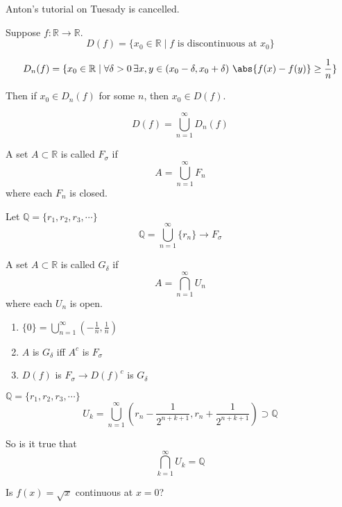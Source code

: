 
Anton's tutorial on Tuesady is cancelled.


Suppose $f\colon \mathbb{R}\to\mathbb{R}$. \[D(f) =\{x_0\in\mathbb{R} \mid f \text{ is discontinuous at }x_0\}\]

\[D_n(f) = \{x_0\in\mathbb{R} \mid \forall \delta>0 \, \exists x,y\in (x_0-\delta ,x_0+\delta) \ \abs{f(x) - f(y)}\geq \frac{1}{n}\}\]

Then if $x_0\in D_n(f)$ for some $n$, then $x_0 \in D(f)$.

\begin{note}
    \[D(f) = \bigcup_{n=1}^\infty D_n(f)\]
\end{note}

\begin{defn}
    A set $A\subset \mathbb{R}$ is called $F_\sigma$ if \[A = \bigcup_{n=1}^\infty F_n\] where each $F_n$ is closed.
\end{defn}

\begin{exmp} Let $\mathbb{Q} = \{r_1,r_2,r_3,\cdots\}$
    \[\mathbb{Q} = \bigcup_{n=1}^\infty \{r_n\} \to F_\sigma \]
\end{exmp}

\begin{defn}
    A set $A\subset \mathbb{R}$ is called $G_\delta$ if \[A = \bigcap_{n=1}^\infty U_n\] where each $U_n$ is open.
\end{defn}

\begin{note}
    \begin{enumerate}
        \item $\{0\} = \bigcup_{n=1}^\infty (-\frac{1}{n},\frac{1}{n})$
        \item $A$ is $G_\delta$ iff $A^c$ is $F_\sigma$
        \item $D(f)$ is $F_\sigma \to D(f)^c $ is $G_\delta$
    \end{enumerate}
\end{note}

\begin{note}
    $\mathbb{Q} = \{r_1,r_2,r_3,\cdots\}$   
    \[U_k = \bigcup_{n=1}^\infty (r_n-\frac{1}{2^{n+k+1}},r_n+\frac{1}{2^{n+k+1}}) \supset \mathbb{Q}\]
    
    So is it true that \[\bigcap_{k=1}^{\infty} U_k = \mathbb{Q}\] 
\end{note}

\begin{ques}
Is $f(x) = \sqrt{x}$ continuous at $x=0$?
\end{ques}

